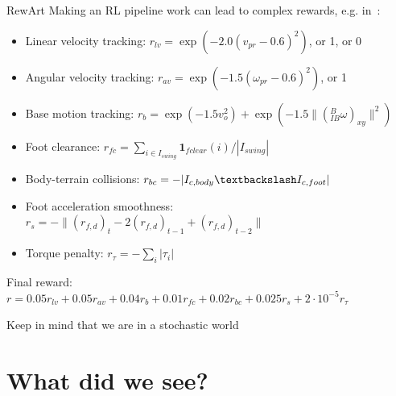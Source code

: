 \documentclass[10pt, aspectratio=1610]{beamer}
\begin{document}
\begin{frame}{RewArt}
    Making an RL pipeline work can lead to complex rewards, e.g. in~\cite{lee2020}:
    \begin{itemize}
        \item Linear velocity tracking: $r_{lv} = \exp(-2.0 (v_{pr} - 0.6)^2)$, or 1, or 0
        \item Angular velocity tracking: $r_{av} = \exp(-1.5 (\omega_{pr} - 0.6)^2)$, or 1
        \item Base motion tracking: $r_b = \exp(-1.5v_o^2) + \exp(-1.5 \|({}^B_{IB} \omega)_{xy}\|^2)$
        \item Foot clearance: $r_{fc} = \sum_{i \in I_{swing}} \mathbf{1}_{fclear}(i) / |I_{swing}|$
        \item Body-terrain collisions: $r_{bc} = -|I_{c,body} \textbackslash I_{c,foot}|$
        \item Foot acceleration smoothness: $r_{s} = -\| (r_{f,d})_t - 2(r_{f,d})_{t-1} + (r_{f,d})_{t-2}\|$
        \item Torque penalty: $r_{\tau} = -\sum_{i} | \tau_i |$
    \end{itemize}
    Final reward: $r = 0.05 r_{lv} + 0.05 r_{av} + 0.04 r_b + 0.01 r_{fc} + 0.02 r_{bc} + 0.025 r_s + 2 \cdot 10^{-5} r_{\tau}$
\end{frame}

\begin{frame}{Keep in mind that we are in a stochastic world}
    \begin{figure}
        \centering
        \caption{
        }
    \end{figure}
\end{frame}

\section{What did we see?}
\end{document}
